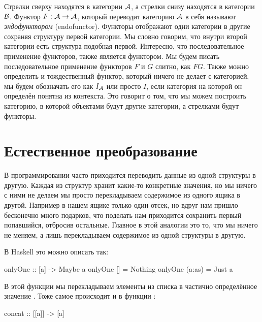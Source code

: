 \begin{centering}



\end{centering}

Стрелки сверху находятся в категории $\mathcal{A}$, а стрелки снизу находятся
в категории $\mathcal{B}$. Функтор $F : \mathcal{A} \rightarrow \mathcal{A}$, который переводит
категорию $\mathcal{A}$ в себя называют 
\emph{эндофунктором} (endofunctor). Функторы отображают одни категории в
другие сохраняя структуру первой категории. Мы словно говорим, что
внутри второй категории есть структура подобная первой. Интересно, что
последовательное применение функторов, также является функтором. Мы
будем писать последовательное применение функторов $F$ и $G$ слитно, как
$FG$. Также можно определить и тождественный функтор, который ничего не
делает с категорией, мы будем обозначать его как $I_{\mathcal{A}}$ или просто
$I$, если категория на которой он определён понятна из контекста. Это
говорит о том, что мы можем построить категорию, в которой объектами
будут другие категории, а стрелками будут функторы.

\section{Естественное преобразование}

В программировании часто приходится переводить данные из одной структуры
в другую. Каждая из структур хранит какие-то конкретные значения, но мы
ничего с ними не делаем мы просто перекладываем содержимое из одного
ящика в другой. Например в нашем ящике только один отсек, но вдруг нам
пришло бесконечно много подарков, что поделать нам приходится сохранить
первый попавшийся, отбросив остальные. Главное в этой аналогии это то,
что мы ничего не меняем, а лишь перекладываем содержимое из одной
структуры в другую.

В Haskell это можно описать так:


\begin{code}
onlyOne :: [a] -> Maybe a
onlyOne []      = Nothing
onlyOne (a:as)  = Just a
\end{code}

В этой функции мы перекладываем элементы из списка \In{[a]} в частично
определённое значение . Тоже самое происходит и в функции
:


\begin{code}
concat :: [[a]] -> [a]
\end{code}

